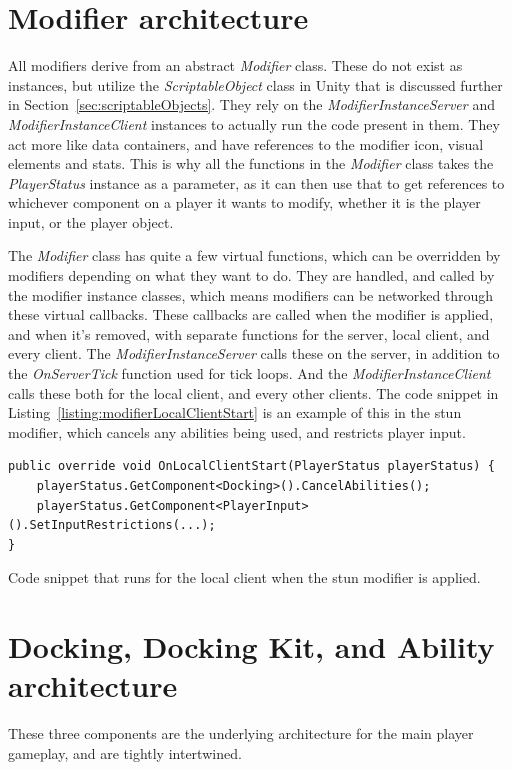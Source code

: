 \section{Modifier architecture}
\label{sec:modifiers}

All modifiers derive from an abstract \emph{Modifier} class. These do not exist as instances, but utilize the \emph{ScriptableObject} class in Unity that is discussed further in Section~\ref{sec:scriptableObjects}. They rely on the \emph{ModifierInstanceServer} and \emph{ModifierInstanceClient} instances to actually run the code present in them. They act more like data containers, and have references to the modifier icon, visual elements and stats. This is why all the functions in the \emph{Modifier} class takes the \emph{PlayerStatus} instance as a parameter, as it can then use that to get references to whichever component on a player it wants to modify, whether it is the player input, or the player object.

The \emph{Modifier} class has quite a few virtual functions, which can be overridden by modifiers depending on what they want to do. They are handled, and called by the modifier instance classes, which means modifiers can be networked through these virtual callbacks. These callbacks are called when the modifier is applied, and when it's removed, with separate functions for the server, local client, and every client. The \emph{ModifierInstanceServer} calls these on the server, in addition to the \emph{OnServerTick} function used for tick loops. And the \emph{ModifierInstanceClient} calls these both for the local client, and every other clients. The code snippet in Listing~\ref{listing:modifierLocalClientStart} is an example of this in the stun modifier, which cancels any abilities being used, and restricts player input.

\begin{listing}[htb]
\begin{verbatim}
public override void OnLocalClientStart(PlayerStatus playerStatus) {
    playerStatus.GetComponent<Docking>().CancelAbilities();
    playerStatus.GetComponent<PlayerInput>().SetInputRestrictions(...);
}
\end{verbatim}
\caption[Stun modifier on start]{Code snippet that runs for the local client when the stun modifier is applied.}
\label{listing:modifierLocalClientStart}
\end{listing}


\section{Docking, Docking Kit, and Ability architecture}
These three components are the underlying architecture for the main player gameplay, and are tightly intertwined.

